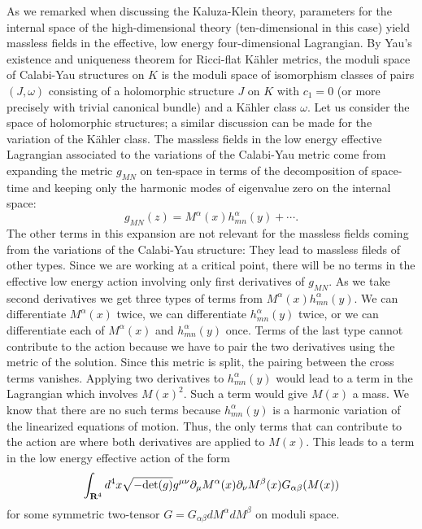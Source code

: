 As we remarked when discussing the Kaluza-Klein theory, parameters for
the internal space of the high-dimensional theory (ten-dimensional in
this case) yield massless fields in the effective, low energy
four-dimensional Lagrangian. 
By Yau's existence and uniqueness theorem for Ricci-flat K\"ahler
metrics, the moduli space of Calabi-Yau structures on $K$ is the
moduli space of isomorphism classes of pairs $(J,\omega)$ consisting of a
 holomorphic structure $J$ on $K$ with $c_1=0$ (or more precisely with
trivial canonical bundle) and a K\"ahler class
$\omega$. Let us consider the space of holomorphic structures; a
similar  discussion can be made for the variation of the  K\"ahler
class.  The massless fields in the low energy
effective Lagrangian associated to the
variations of the Calabi-Yau metric come from expanding the metric
$g_{MN}$ on ten-space in terms of the decomposition of space-time
and keeping only the harmonic modes of eigenvalue zero on the internal
space:
$$g_{MN}(z)=M^\alpha(x)h_{mn}^\alpha(y)+ \cdots .$$
The other terms in this expansion are not relevant for the massless
fields coming from the variations of the Calabi-Yau structure:
They lead to massless fileds of other types.
Since we are working at a critical point, there will be no terms
in the effective low energy action involving only first derivatives of
$g_{MN}$.  As we take second 
derivatives we get three types of terms from
$M^\alpha(x)h_{mn}^\alpha(y)$. We can differentiate $M^\alpha(x)$ twice,
we can differentiate 
$h_{mn}^\alpha(y)$ twice, or we can differentiate each of
$M^\alpha(x)$ and $h_{mn}^\alpha(y)$ once. Terms of the last type cannot
contribute to the action 
because we have to pair the two derivatives using the metric of the
solution.  Since this metric is split, the pairing between the cross
terms vanishes. Applying two derivatives to $h_{mn}^\alpha(y)$ would
lead to a term in the Lagrangian which involves $M(x)^2$. Such a term
would give $M(x)$ a mass.  We know that there are no such terms
because $h_{mn}^\alpha(y)$ is a harmonic variation of the linearized
equations of motion.  Thus, the only terms that can
contribute to the action are where both derivatives are applied to
$M(x)$. 
This leads to a term in the low energy effective action of the form
$$\int_{{\bf R}^4} d^4x\sqrt{-{\rm
det}(g)}g^{\mu\nu}\partial_\mu M^\alpha(x)\partial_\nu M^\beta(x)
G_{\alpha\beta}(M(x)) $$
for some symmetric two-tensor $G=G_{\alpha\beta}dM^\alpha dM^\beta$ on
moduli space.  


